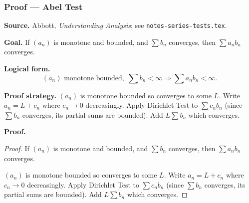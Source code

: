 
\clearpage
{}
\hypertarget{proof-RA-ABB-T-abel-test}{}

\subsubsection[Abel Test]{Proof --- Abel Test}

\bigskip

\noindent
\textbf{Source.} Abbott, \emph{Understanding Analysis}; see \texttt{notes-series-tests.tex}.

\vspace{0.75em}

\noindent
\textbf{Goal.} If $(a_n)$ is monotone and bounded, and $\sum b_n$ converges, then $\sum a_n b_n$ converges.

\vspace{0.75em}

\noindent
\textbf{Logical form.}
\[
  (a_n) \text{ monotone bounded},\; \sum b_n < \infty \Rightarrow \sum a_n b_n < \infty.
\]

\vspace{0.75em}

\noindent
\textbf{Proof strategy.} $(a_n)$ is monotone bounded so converges to some $L$. Write $a_n = L + c_n$ where $c_n \to 0$ decreasingly. Apply Dirichlet Test to $\sum c_n b_n$ (since $\sum b_n$ converges, its partial sums are bounded). Add $L \sum b_n$ which converges.

\vspace{0.75em}

\noindent
\textbf{Proof.}
\begin{proof}
\Claim If $(a_n)$ is monotone and bounded, and $\sum b_n$ converges, then $\sum a_n b_n$ converges.

\Given 

\Goal 

\Strategy $(a_n)$ is monotone bounded so converges to some $L$. Write $a_n = L + c_n$ where $c_n \to 0$ decreasingly. Apply Dirichlet Test to $\sum c_n b_n$ (since $\sum b_n$ converges, its partial sums are bounded). Add $L \sum b_n$ which converges.

\medskip


\end{proof}

